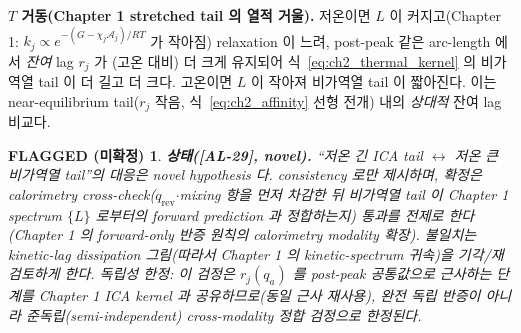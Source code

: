 \documentclass[11pt,a4paper]{article}
\newtheorem*{flagbox}{FLAGGED (미확정)}
\newcommand{\rev}{\mathrm{rev}}
\newcommand{\AL}[1]{\textsf{[AL-#1]}}
\begin{document}
\textbf{$T$ 거동(Chapter 1 stretched tail 의 열적 거울).} 저온이면 $L$ 이 커지고(Chapter 1: $k_j\propto e^{-(G-\chi_j\mathcal A_j)/RT}$
가 작아짐) relaxation 이 느려, post-peak 같은 arc-length 에서 \emph{잔여} lag $r_j$ 가 (고온 대비) 더 크게
유지되어 식~\eqref{eq:ch2_thermal_kernel} 의 비가역열 tail 이 더 길고 더 크다. 고온이면 $L$ 이 작아져 비가역열
tail 이 짧아진다. 이는 near-equilibrium tail($r_j$ 작음, 식~\eqref{eq:ch2_affinity} 선형 전개) 내의 \emph{상대적}
잔여 lag 비교다.
\begin{flagbox}
\textbf{상태(\AL{29}, novel).} ``저온 긴 ICA tail $\leftrightarrow$ 저온 큰 비가역열 tail''의 대응은 novel
hypothesis 다. consistency 로만 제시하며, \emph{확정}은 calorimetry cross-check($q_\rev$$\cdot$mixing 항을
먼저 차감한 뒤 비가역열 tail 이 Chapter 1 spectrum $\{L\}$ 로부터의 forward prediction 과 정합하는지) 통과를
전제로 한다(Chapter 1 의 forward-only 반증 원칙의 calorimetry modality 확장). 불일치는 kinetic-lag dissipation
그림(따라서 Chapter 1 의 kinetic-spectrum 귀속)을 기각/재검토하게 한다. \emph{독립성 한정}: 이 검정은 $r_j(q_a)$
를 post-peak 공통값으로 근사하는 단계를 Chapter 1 ICA kernel 과 \emph{공유}하므로(동일 근사 재사용), 완전 독립
반증이 아니라 \emph{준독립}(semi-independent) cross-modality 정합 검정으로 한정된다.
\end{flagbox}

\end{document}
